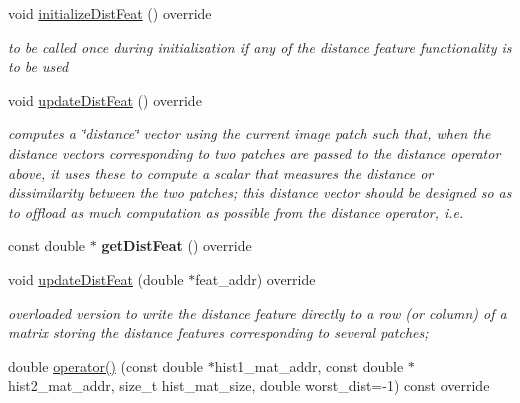 \begin{DoxyCompactItemize}
\item 
\hypertarget{classCCRE_a217052773a5664d03548b20a0fc41f2f}{void \hyperlink{classCCRE_a217052773a5664d03548b20a0fc41f2f}{initialize\-Dist\-Feat} () override}\label{classCCRE_a217052773a5664d03548b20a0fc41f2f}

\begin{DoxyCompactList}\small\item\em to be called once during initialization if any of the distance feature functionality is to be used \end{DoxyCompactList}\item 
void \hyperlink{classCCRE_a102becb1188b7408863bc2036b07b079}{update\-Dist\-Feat} () override
\begin{DoxyCompactList}\small\item\em computes a \char`\"{}distance\char`\"{} vector using the current image patch such that, when the distance vectors corresponding to two patches are passed to the distance operator above, it uses these to compute a scalar that measures the distance or dissimilarity between the two patches; this distance vector should be designed so as to offload as much computation as possible from the distance operator, i.\-e. \end{DoxyCompactList}\item 
\hypertarget{classCCRE_a74605d82644df1e0407288900b8af4f8}{const double $\ast$ {\bfseries get\-Dist\-Feat} () override}\label{classCCRE_a74605d82644df1e0407288900b8af4f8}

\item 
\hypertarget{classCCRE_a1abb4b695361b138deb6b8f3b056bcbc}{void \hyperlink{classCCRE_a1abb4b695361b138deb6b8f3b056bcbc}{update\-Dist\-Feat} (double $\ast$feat\-\_\-addr) override}\label{classCCRE_a1abb4b695361b138deb6b8f3b056bcbc}

\begin{DoxyCompactList}\small\item\em overloaded version to write the distance feature directly to a row (or column) of a matrix storing the distance features corresponding to several patches; \end{DoxyCompactList}\item 
\hypertarget{classCCRE_a661e2c1055913da2b72432d0e0bba590}{double \hyperlink{classCCRE_a661e2c1055913da2b72432d0e0bba590}{operator()} (const double $\ast$hist1\-\_\-mat\-\_\-addr, const double $\ast$hist2\-\_\-mat\-\_\-addr, size\-\_\-t hist\-\_\-mat\-\_\-size, double worst\-\_\-dist=-\/1) const override}\label{classCCRE_a661e2c1055913da2b72432d0e0bba590}


\end{DoxyCompactItemize}
